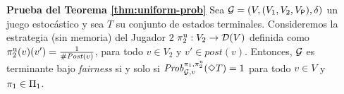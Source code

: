 \noindent
\textbf{Prueba del Teorema \ref{thm:uniform-prob}}
  Sea $\mathcal{G} = (V, (V_1, V_2, V_{\mathsf{P}}), \delta)$ un juego estocástico y sea $T$ su conjunto de estados terminales.
  Consideremos la estrategia (sin memoria) del Jugador $2$
  $\pi^{\mathrm{u}}_{2} : V_2 \rightarrow \mathcal{D}(V)$ definida como
  $\pi^{\mathrm{u}}_{2}(v)(v') = \frac{1}{\# \mathit{Post}(v)}$, para todo $v \in
  V_2$ y $v' \in post(v)$.
  Entonces, $\mathcal{G}$ es terminante bajo \emph{fairness} si y solo si
  $\mathit{Prob}^{\pi_{1}, \pi^{\mathrm{u}}_{2}}_{\mathcal{G},v}(\Diamond T)=1$ para
  todo $v\in V$ y $\pi_{1} \in \Pi_{1}$.
\noindent \\ 


